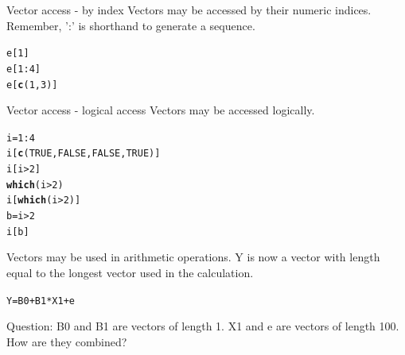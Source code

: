 \documentclass[xcolor=dvipsnames]{beamer}
\makeatletter
\newcommand{\hlnum}[1]{\textcolor[rgb]{0.686,0.059,0.569}{#1}}%
\newcommand{\hlopt}[1]{\textcolor[rgb]{0,0,0}{#1}}%
\newcommand{\hlstd}[1]{\textcolor[rgb]{0.345,0.345,0.345}{#1}}%
\newcommand{\hlkwb}[1]{\textcolor[rgb]{0.69,0.353,0.396}{#1}}%
\newcommand{\hlkwd}[1]{\textcolor[rgb]{0.737,0.353,0.396}{\textbf{#1}}}%
\newenvironment{kframe}{%
 \def\at@end@of@kframe{}%
 \ifinner\ifhmode%
  \def\at@end@of@kframe{\end{minipage}}%
  \begin{minipage}{\columnwidth}%
 \fi\fi%
 \def\FrameCommand##1{\hskip\@totalleftmargin \hskip-\fboxsep
 \colorbox{shadecolor}{##1}\hskip-\fboxsep
     \hskip-\linewidth \hskip-\@totalleftmargin \hskip\columnwidth}%
 \MakeFramed {\advance\hsize-\width
   \@totalleftmargin\z@ \linewidth\hsize
   \@setminipage}}%
 {\par\unskip\endMakeFramed%
 \at@end@of@kframe}
\newenvironment{knitrout}{}{} %
\makeatother
\begin{document}
\begin{frame}[fragile]{Vector access - by index}
  Vectors may be accessed by their numeric indices. Remember, ':' is shorthand to generate a sequence.
\begin{knitrout}
\color{fgcolor}\begin{kframe}
\begin{alltt}
\hlstd{e[}\hlnum{1}\hlstd{]}
\hlstd{e[}\hlnum{1}\hlopt{:}\hlnum{4}\hlstd{]}
\hlstd{e[}\hlkwd{c}\hlstd{(}\hlnum{1}\hlstd{,} \hlnum{3}\hlstd{)]}
\end{alltt}
\end{kframe}
\end{knitrout}

\end{frame}

\begin{frame}[fragile]{Vector access - logical access}
  Vectors may be accessed logically.
\begin{knitrout}
\color{fgcolor}\begin{kframe}
\begin{alltt}
\hlstd{i} \hlkwb{=} \hlnum{1}\hlopt{:}\hlnum{4}
\hlstd{i[}\hlkwd{c}\hlstd{(}\hlnum{TRUE}\hlstd{,} \hlnum{FALSE}\hlstd{,} \hlnum{FALSE}\hlstd{,} \hlnum{TRUE}\hlstd{)]}
\hlstd{i[i} \hlopt{>} \hlnum{2}\hlstd{]}
\hlkwd{which}\hlstd{(i} \hlopt{>} \hlnum{2}\hlstd{)}
\hlstd{i[}\hlkwd{which}\hlstd{(i} \hlopt{>} \hlnum{2}\hlstd{)]}
\hlstd{b} \hlkwb{=} \hlstd{i} \hlopt{>} \hlnum{2}
\hlstd{i[b]}
\end{alltt}
\end{kframe}
\end{knitrout}

\end{frame}

\begin{frame}[fragile]
  Vectors may be used in arithmetic operations. Y is now a vector with length equal to the longest vector used in the calculation.
  
\begin{knitrout}
\color{fgcolor}\begin{kframe}
\begin{alltt}
\hlstd{Y} \hlkwb{=} \hlstd{B0} \hlopt{+} \hlstd{B1} \hlopt{*} \hlstd{X1} \hlopt{+} \hlstd{e}
\end{alltt}
\end{kframe}
\end{knitrout}

  Question: B0 and B1 are vectors of length 1. X1 and e are vectors of length 100. How are they combined?
\end{frame}
\end{document}
